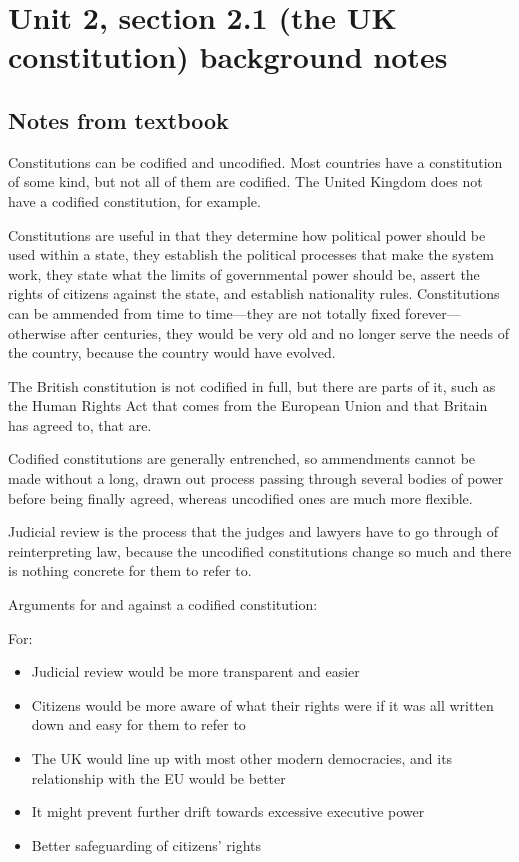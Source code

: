 \documentclass[12pt]{article}
\begin{document}
\section*{Unit 2, section 2.1 (the UK constitution) background notes}

\subsection*{Notes from textbook}

Constitutions can be codified and uncodified.  Most countries have a constitution of some kind, but not all of them are codified.  The United Kingdom does not have a codified constitution, for example.

Constitutions are useful in that they determine how political power should be used within a state, they establish the political processes that make the system work, they state what the limits of governmental power should be, assert the rights of citizens against the state, and establish nationality rules.  Constitutions can be ammended from time to time---they are not totally fixed forever---otherwise after centuries, they would be very old and no longer serve the needs of the country, because the country would have evolved.

The British constitution is not codified in full, but there are parts of it, such as the Human Rights Act that comes from the European Union and that Britain has agreed to, that are.

Codified constitutions are generally entrenched, so ammendments cannot be made without a long, drawn out process passing through several bodies of power before being finally agreed, whereas uncodified ones are much more flexible.

Judicial review is the process that the judges and lawyers have to go through of reinterpreting law, because the uncodified constitutions change so much and there is nothing concrete for them to refer to.

Arguments for and against a codified constitution:

For:
\begin{itemize}
	\item{Judicial review would be more transparent and easier}
	\item{Citizens would be more aware of what their rights were if it was all written down and easy for them to refer to}
	\item{The UK would line up with most other modern democracies, and its relationship with the EU would be better}
	\item{It might prevent further drift towards excessive executive power}
	\item{Better safeguarding of citizens' rights}
\end{itemize}
\end{document}
